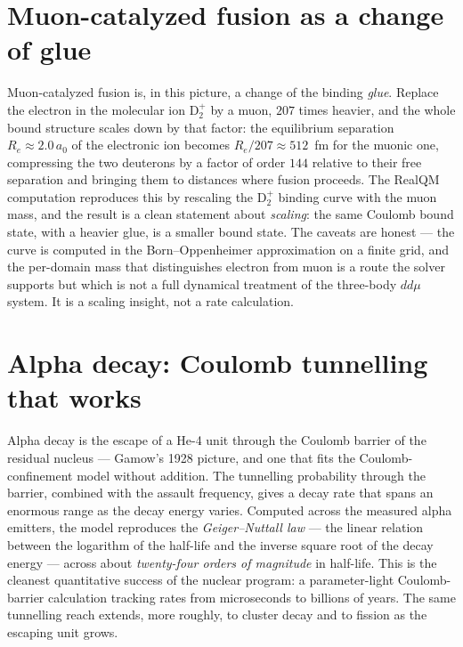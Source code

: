 \section{Muon-catalyzed fusion as a change of glue}\label{sec:muon-fusion}

Muon-catalyzed fusion is, in this picture, a change of the binding \emph{glue}. Replace the electron in the
molecular ion $\mathrm{D}_2^+$ by a muon, $207$ times heavier, and the whole bound structure scales down by that
factor: the equilibrium separation $R_e\approx 2.0\,a_0$ of the electronic ion becomes $R_e/207\approx 512$~fm
for the muonic one, compressing the two deuterons by a factor of order $144$ relative to their free separation
and bringing them to distances where fusion proceeds. The RealQM computation reproduces this by rescaling the
$\mathrm{D}_2^+$ binding curve with the muon mass, and the result is a clean statement about \emph{scaling}: the
same Coulomb bound state, with a heavier glue, is a smaller bound state. The caveats are honest --- the curve is
computed in the Born--Oppenheimer approximation on a finite grid, and the per-domain mass that distinguishes
electron from muon is a route the solver supports but which is not a full dynamical treatment of the three-body
$dd\mu$ system. It is a scaling insight, not a rate calculation.

\section{Alpha decay: Coulomb tunnelling that works}\label{sec:alpha-decay}

Alpha decay is the escape of a He-4 unit through the Coulomb barrier of the residual nucleus --- Gamow's 1928
picture, and one that fits the Coulomb-confinement model without addition. The tunnelling probability through the
barrier, combined with the assault frequency, gives a decay rate that spans an enormous range as the decay energy
varies. Computed across the measured alpha emitters, the model reproduces the \emph{Geiger--Nuttall law} --- the
linear relation between the logarithm of the half-life and the inverse square root of the decay energy --- across
about \emph{twenty-four orders of magnitude} in half-life. This is the cleanest quantitative success of the
nuclear program: a parameter-light Coulomb-barrier calculation tracking rates from microseconds to billions of
years. The same tunnelling reach extends, more roughly, to cluster decay and to fission as the escaping unit
grows.

